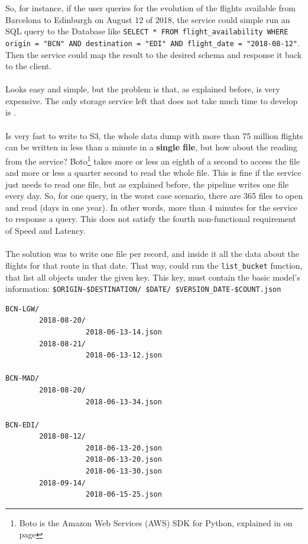 So, for instance, if the user queries for the evolution of the flights available from Barcelona to Edinburgh on August 12 of 2018, the service could simple run an SQL query to the Database like \texttt{SELECT * FROM flight\_availability WHERE origin = "BCN" AND destination = "EDI" AND flight\_date = "2018-08-12"}. Then the service could map the result to the desired schema and response it back to the client.
\\\\
Looks easy and simple, but the problem is that, as explained before,  is very expensive. The only storage service left that does not take much time to develop is .
\\\\
Is very fast to write to S3, the whole data dump with more than 75 million flights can be written in less than a minute in a \textbf{single file}, but how about the reading from the service? Boto\footnote{Boto is the Amazon Web Services (AWS) SDK for Python, explained in  on page \pageref{boto3}} takes more or less an eighth of a second to access the file and more or less a quarter second to read the whole file. This is fine if the service just needs to read one file, but as explained before, the pipeline writes one file every day. So, for one query, in the worst case scenario, there are 365 files to open and read (days in one year). In other words, more than 4 minutes for the service to response a query. This does not satisfy the fourth non-functional requirement of Speed and Latency.
\\\\
The solution was to write one file per record, and inside it all the data about the flights for that route in that date. That way,  could run the \texttt{list\_bucket} function, that list all objects under the given key. This key, must contain the basic model's information:
\texttt{\$ORIGIN-\$DESTINATION/ \$DATE/ \$VERSION\_DATE-\$COUNT.json}

\break

\begin{verbatim}
BCN-LGW/
        2018-08-20/
                   2018-06-13-14.json
        2018-08-21/
                   2018-06-13-12.json

BCN-MAD/
        2018-08-20/
                   2018-06-13-34.json

BCN-EDI/
        2018-08-12/
                   2018-06-13-20.json
                   2018-06-13-20.json
                   2018-06-13-30.json
        2018-09-14/
                   2018-06-15-25.json
\end{verbatim}

